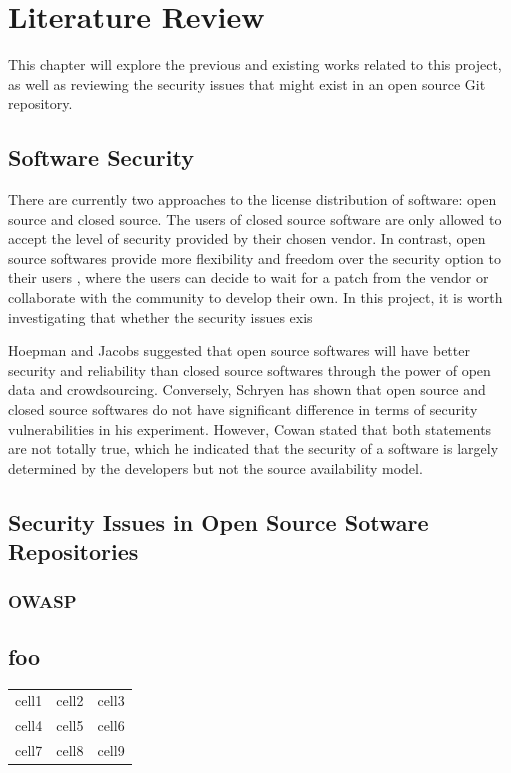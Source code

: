 \documentclass[12pt, a4paper]{report}
\begin{document}
\chapter{Literature Review}
This chapter will explore the previous and existing works related to this project, as well as
reviewing the security issues that might exist in an open source Git repository.

\section{Software Security}
There are currently two approaches to the license distribution of software: open source and closed
source. The users of closed source software are only allowed to accept the level of security
provided by their chosen vendor. In contrast, open source softwares provide more flexibility and
freedom over the security option to their users \cite{payne_2002}, where the users can decide to
wait for a patch from the vendor or collaborate with the community to develop their own. In this
project, it is worth investigating that whether the security issues exis

Hoepman and Jacobs \cite{hoepman_2007} suggested that open source softwares will have better
security and reliability than closed source softwares through the power of open data and
crowdsourcing. Conversely, Schryen \cite{schryen_2011} has shown that open source and closed source
softwares do not have significant difference in terms of security vulnerabilities in his experiment.
However, Cowan \cite{cowan_2003} stated that both statements are not totally true, which he
indicated that the security of a software is largely determined by the developers but not the source
availability model.

\section{Security Issues in Open Source Sotware Repositories}
\subsection{OWASP}

\section{foo}
\begin{table}[H] \begin{center} \begin{tabular}{ c c c } cell1 & cell2 & cell3 \\
      cell4 & cell5 & cell6 \\
      cell7 & cell8 & cell9 \end{tabular} \label{table:celltable}
    \end{center} \end{table}
\end{document}
